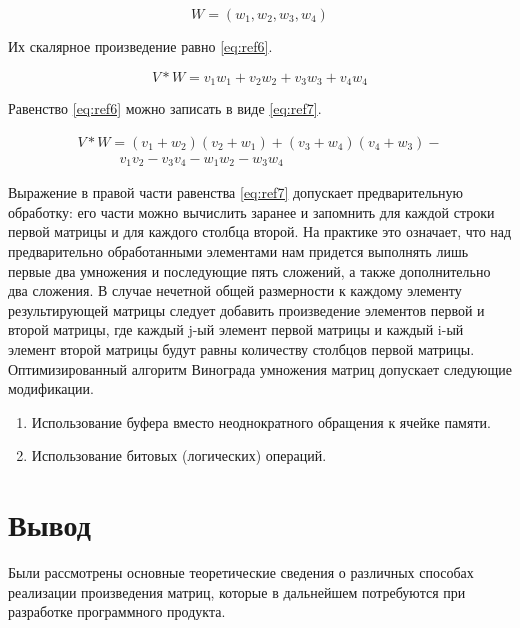 \documentclass[12pt]{report}
\begin{document}
\begin{equation}
	W = (w_1, w_2, w_3, w_4)
	\label{eq:ref5}
\end{equation}

Их скалярное произведение равно  \ref{eq:ref6}.

\begin{equation}
	V * W = v_1w_1 + v_2w_2 + v_3w_3 + v_4w_4
	\label{eq:ref6}
\end{equation}

Равенство \ref{eq:ref6} можно записать в виде \ref{eq:ref7}.

\begin{equation}
	\begin{array}{l}
		V * W = (v_1 + w_2)(v_2 + w_1) + (v_3 + w_4)(v_4 + w_3) - \\
		\quad \quad \quad v_1v_2 - v_3v_4 - w_1w_2 - w_3w_4
	\end{array}
	\label{eq:ref7}
\end{equation}

Выражение в правой части равенства \ref{eq:ref7} допускает предварительную обработку:
его части можно вычислить заранее и запомнить для каждой строки первой матрицы и для каждого столбца второй. На практике это означает,
что над предварительно обработанными элементами нам придется выполнять лишь первые два умножения и последующие пять сложений, а
также дополнительно два сложения. В случае нечетной общей размерности к каждому элементу результирующей матрицы следует добавить произведение элементов первой и второй матрицы, где каждый j-ый элемент первой матрицы и каждый i-ый элемент второй матрицы будут равны количеству столбцов первой матрицы.
Оптимизированный алгоритм Винограда умножения матриц допускает следующие модификации.

\begin{enumerate}
	\item Использование буфера вместо неоднократного обращения к ячейке памяти.
	\item Использование битовых (логических) операций.
\end{enumerate}


\section{Вывод}

Были рассмотрены основные теоретические сведения о различных способах реализации произведения матриц, которые в дальнейшем потребуются при разработке программного продукта.  
\end{document}
